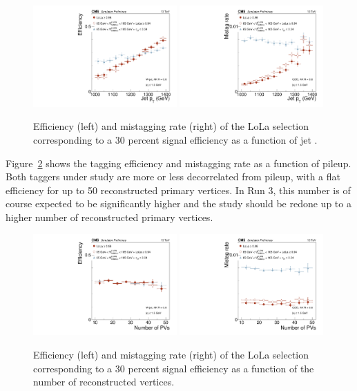 \begin{figure}[h!]
\centering
\includegraphics[width=0.49\textwidth]{figures/vtagging/AN-18-099/validation/WtagSigEffvsjpt.pdf}
\includegraphics[width=0.49\textwidth]{figures/vtagging/AN-18-099/validation/QCDMistagvsjpt.pdf}
\caption{Efficiency (left) and mistagging rate (right) of the LoLa selection corresponding to a 30 percent signal efficiency as a function of jet \PT.}
\label{fig:lola:eff_val_pt}
\end{figure}
Figure~\ref{fig:lola:eff_val_pu} shows the tagging efficiency and mistagging rate as a function of pileup. Both taggers under study are more or less decorrelated from pileup, with a flat efficiency for up to 50 reconstructed primary vertices. In Run 3, this number is of course expected to be significantly higher and the study should be redone up to a higher number of reconstructed primary vertices.
\begin{figure}[h!]
\centering
\includegraphics[width=0.49\textwidth]{figures/vtagging/AN-18-099/validation/WtagSigEffvsnPV.pdf}
\includegraphics[width=0.49\textwidth]{figures/vtagging/AN-18-099/validation/QCDMistagvsnPV.pdf}
\caption{Efficiency (left) and mistagging rate (right) of the LoLa selection corresponding to a 30 percent signal efficiency as a function of the number of reconstructed vertices.}
\label{fig:lola:eff_val_pu}
\end{figure}
